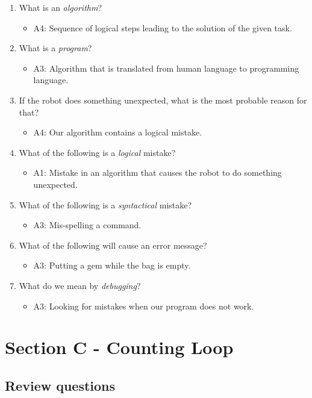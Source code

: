 \documentclass[article,A4,12pt]{llncs}
\begin{document}
\begin{enumerate}
\item What is an {\em algorithm}?
  \begin{itemize}
    \item A4: Sequence of logical steps leading to the solution of the given task.
  \end{itemize}
\item What is a {\em program}?
  \begin{itemize}
    \item A3: Algorithm that is translated from human language to programming language.
  \end{itemize}
\item If the robot does something unexpected, what is the most probable reason for that?
  \begin{itemize}
    \item A4: Our algorithm contains a logical mistake.
  \end{itemize}
\item What of the following is a {\em logical} mistake?
  \begin{itemize}
    \item A1: Mistake in an algorithm that causes the robot to do something unexpected.
  \end{itemize}
\item What of the following is a {\em syntactical} mistake?
  \begin{itemize}
    \item A3: Mis-spelling a command.  
  \end{itemize}
\item What of the following will cause an error message?
  \begin{itemize}
    \item A3: Putting a gem while the bag is empty.
  \end{itemize}
\item What do we mean by {\em debugging}?
  \begin{itemize}
    \item A3: Looking for mistakes when our program does not work.
  \end{itemize}
\end{enumerate}

\section{Section C - Counting Loop}

\subsection{Review questions}
\end{document}
